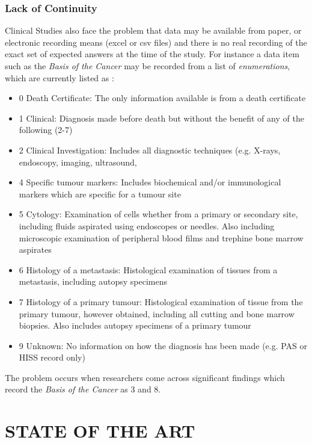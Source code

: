 \documentclass[a4paper,twoside]{article}
\begin{document}
\subsubsection{Lack of Continuity}
Clinical Studies also face the problem that data may be available from paper, or electronic recording means (excel or csv files) and there is no real recording of the exact set of expected answers at the time of the study. For instance a data item such as the \emph{Basis of the Cancer} may be recorded from a list of \emph{enumerations}, which are currently listed as :

\begin{itemize}
	\item 0	Death Certificate: The only information available is from a death certificate
	\item 1	Clinical: Diagnosis made before death but without the benefit of any of the following (2-7)
	\item 2	Clinical Investigation: Includes all diagnostic techniques (e.g. X-rays, endoscopy, imaging, ultrasound,
	\item 4	Specific tumour markers: Includes biochemical and/or immunological markers which are specific for a tumour site	
	\item 5	Cytology: Examination of cells whether from a primary or secondary site, including fluids aspirated using endoscopes or needles. Also including microscopic examination of peripheral blood films and trephine bone marrow aspirates
	\item 6	Histology of a metastasis: Histological examination of tissues from a metastasis, including autopsy specimens	
	\item 7	Histology of a primary tumour: Histological examination of tissue from the primary tumour, however obtained, including all cutting and bone marrow biopsies. Also includes autopsy specimens of a primary tumour
	\item 9	Unknown: No information on how the diagnosis has been made (e.g. PAS or HISS record only)
\end{itemize}

The problem occurs when researchers come across significant findings which record the \emph{Basis of the Cancer} as 3 and 8.


 

\section{\uppercase{STATE OF THE ART}}
\end{document}
